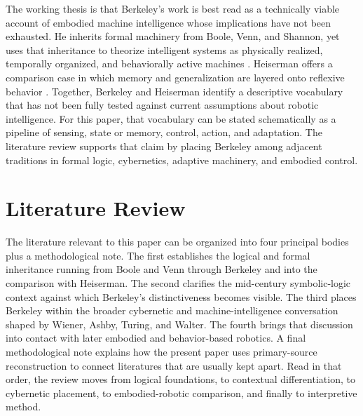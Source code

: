 \documentclass[11pt]{article}
\begin{document}
The working thesis is that Berkeley's work is best read as a technically viable account of embodied machine intelligence whose implications have not been exhausted. He inherits formal machinery from Boole, Venn, and Shannon, yet uses that inheritance to theorize intelligent systems as physically realized, temporally organized, and behaviorally active machines \citep{boole1847mathematical,boole1854laws,venn1894symbolic,shannon1938symbolic}. Heiserman offers a comparison case in which memory and generalization are layered onto reflexive behavior \citep{heiserman1981robot}. Together, Berkeley and Heiserman identify a descriptive vocabulary that has not been fully tested against current assumptions about robotic intelligence. For this paper, that vocabulary can be stated schematically as a pipeline of sensing, state or memory, control, action, and adaptation. The literature review supports that claim by placing Berkeley among adjacent traditions in formal logic, cybernetics, adaptive machinery, and embodied control.

\section{Literature Review}

The literature relevant to this paper can be organized into four principal bodies plus a methodological note. The first establishes the logical and formal inheritance running from Boole and Venn through Berkeley and into the comparison with Heiserman. The second clarifies the mid-century symbolic-logic context against which Berkeley's distinctiveness becomes visible. The third places Berkeley within the broader cybernetic and machine-intelligence conversation shaped by Wiener, Ashby, Turing, and Walter. The fourth brings that discussion into contact with later embodied and behavior-based robotics. A final methodological note explains how the present paper uses primary-source reconstruction to connect literatures that are usually kept apart. Read in that order, the review moves from logical foundations, to contextual differentiation, to cybernetic placement, to embodied-robotic comparison, and finally to interpretive method.
\end{document}
